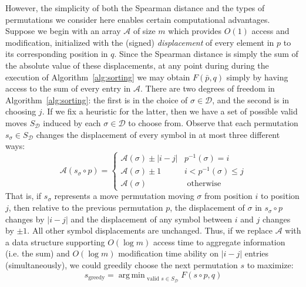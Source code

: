 \documentclass{article} %
\DeclareMathOperator*{\argmin}{arg\,min}
\begin{document}
However, the simplicity of both the Spearman distance and the types of permutations we consider here enables certain computational advantages. Suppose we begin with an array $\mathcal{A}$ of size $m$ which provides $O(1)$ access and modification, initialized with the (signed) \emph{displacement} of every element in $p$ to its corresponding position in $q$. Since the Spearman distance is simply the sum of the absolute value of these displacements, at any point during during the execution of Algorithm~\ref{alg:sorting} we may obtain $F(\bar{p}, q)$ simply by having access to the sum of every entry in $\mathcal{A}$. There are two degrees of freedom in   Algorithm~\ref{alg:sorting}: the first is in the choice of $\sigma \in \mathcal{D}$, and the second is in choosing $j$. If we fix a heuristic for the latter, then we have a set of possible valid moves $S_\mathcal{D}$ induced by each $\sigma \in \mathcal{D}$ to choose from. Observe that each permutation $s_\sigma \in S_\mathcal{D}$ changes the displacement of every symbol in at most three different ways: 
\[
\mathcal{A}(s_\sigma \circ p) = 
\begin{cases} 
	 \mathcal{A}(\sigma) \pm \lvert i - j \rvert & p^{-1}(\sigma) = i \\
	 \mathcal{A}(\sigma) \pm 1 & i < p^{-1}(\sigma) \leq j \\
	 \mathcal{A}(\sigma) & \text{ otherwise }
\end{cases}
\]
That is, if $s_\sigma$ represents a move permutation moving $\sigma$ from position $i$ to position $j$, then relative to the previous permutation $p$, the displacement of $\sigma$ in $s_\sigma \circ p$ changes by $\lvert i - j \rvert$ and the displacement of any symbol between $i$ and $j$ changes by $\pm 1$. 
All other symbol displacements are unchanged. Thus, if we replace $\mathcal{A}$ with a data structure  supporting $O(\log m)$ access time to aggregate information (i.e. the sum) and $O(\log m)$ modification time ability on $\lvert i - j \vert$ entries (simultaneously), we could greedily choose the next permutation $s$ to maximize:
\begin{equation}\label{eq:greedy_step}
	s_{\text{greedy}} = \argmin_{\text{ valid } s \in S_\mathcal{D}} F(s\circ p, q)
\end{equation}  
\end{document}
